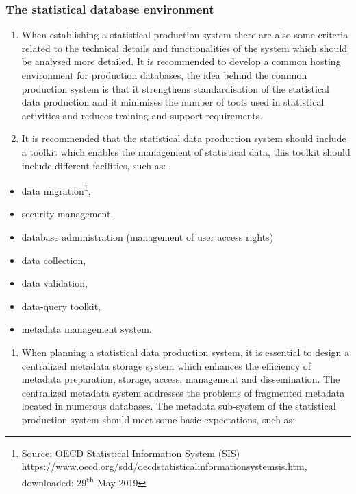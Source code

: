 \documentclass[
]{article}
\providecommand{\tightlist}{%
  \setlength{\itemsep}{0pt}\setlength{\parskip}{0pt}}
\begin{document}
\hypertarget{the-statistical-database-environment}{%
\subsubsection{The statistical database environment}\label{the-statistical-database-environment}}

\begin{enumerate}
\def\labelenumi{\arabic{enumi}.}
\setcounter{enumi}{278}
\item
  When establishing a statistical production system there are also
  some criteria related to the technical details and functionalities
  of the system which should be analysed more detailed. It is
  recommended to develop a common hosting environment for production
  databases, the idea behind the common production system is that it
  strengthens standardisation of the statistical data production and
  it minimises the number of tools used in statistical activities and
  reduces training and support requirements.
\item
  It is recommended that the statistical data production system
  should include a toolkit which enables the management of statistical
  data, this toolkit should include different facilities, such as:
\end{enumerate}

\begin{itemize}
\item
  data migration\footnote{Source: OECD Statistical Information System (SIS)
    \url{https://www.oecd.org/sdd/oecdstatisticalinformationsystemsis.htm},
    downloaded: 29\textsuperscript{th} May 2019},
\item
  security management,
\item
  database administration (management of user access rights)
\item
  data collection,
\item
  data validation,
\item
  data-query toolkit,
\item
  metadata management system.
\end{itemize}

\begin{enumerate}
\def\labelenumi{\arabic{enumi}.}
\setcounter{enumi}{280}
\tightlist
\item
  When planning a statistical data production system, it is essential
  to design a centralized metadata storage system which enhances the
  efficiency of metadata preparation, storage, access, management and
  dissemination. The centralized metadata system addresses the
  problems of fragmented metadata located in numerous databases. The
  metadata sub-system of the statistical production system should meet
  some basic expectations, such as:
\end{enumerate}
\end{document}
